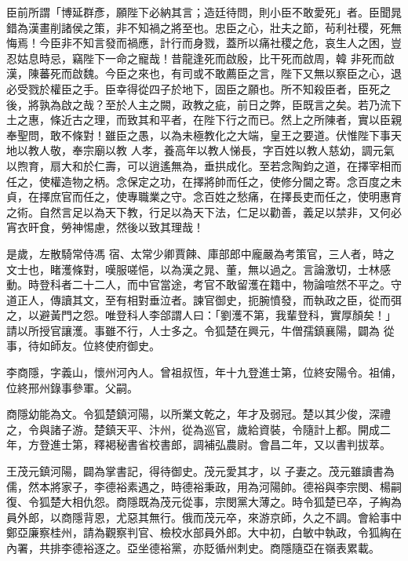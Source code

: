 \begin{pinyinscope}
 臣前所謂「博延群彥，願陛下必納其言；造廷待問，則小臣不敢愛死」者。臣聞晁錯為漢畫削諸侯之策，非不知禍之將至也。忠臣之心，壯夫之節，茍利社稷，死無悔焉！今臣非不知言發而禍應，計行而身戮，蓋所以痛社稷之危，哀生人之困，豈忍姑息時忌，竊陛下一命之寵哉！昔龍逢死而啟殷，比干死而啟周，韓
 非死而啟漢，陳蕃死而啟魏。今臣之來也，有司或不敢薦臣之言，陛下又無以察臣之心，退必受戮於權臣之手。臣幸得從四子於地下，固臣之願也。所不知殺臣者，臣死之後，將孰為啟之哉？至於人主之闕，政教之疵，前日之弊，臣既言之矣。若乃流下土之惠，條近古之理，而致其和平者，在陛下行之而已。然上之所陳者，實以臣親奉聖問，敢不條對！雖臣之愚，以為未極教化之大端，皇王之要道。伏惟陛下事天地以教人敬，奉宗廟以教
 人孝，養高年以教人悌長，字百姓以教人慈幼，調元氣以煦育，扇大和於仁壽，可以逍遙無為，垂拱成化。至若念陶鈞之道，在擇宰相而任之，使權造物之柄。念保定之功，在擇將帥而任之，使修分閫之寄。念百度之未貞，在擇庶官而任之，使專職業之守。念百姓之愁痛，在擇長吏而任之，使明惠育之術。自然言足以為天下教，行足以為天下法，仁足以勸善，義足以禁非，又何必宵衣旰食，勞神惕慮，然後以致其理哉！



 是歲，左散騎常侍馮
 宿、太常少卿賈餗、庫部郎中龐嚴為考策官，三人者，時之文士也，睹濩條對，嘆服嗟悒，以為漢之晁、董，無以過之。言論激切，士林感動。時登科者二十二人，而中官當途，考官不敢留濩在籍中，物論喧然不平之。守道正人，傳讀其文，至有相對垂泣者。諫官御史，扼腕憤發，而執政之臣，從而弭之，以避黃門之怨。唯登科人李郃謂人曰：「劉濩不第，我輩登科，實厚顏矣！」請以所授官讓濩。事雖不行，人士多之。令狐楚在興元，牛僧孺鎮襄陽，闢為
 從事，待如師友。位終使府御史。



 李商隱，字義山，懷州河內人。曾祖叔恆，年十九登進士第，位終安陽令。祖俌，位終邢州錄事參軍。父嗣。



 商隱幼能為文。令狐楚鎮河陽，以所業文乾之，年才及弱冠。楚以其少俊，深禮之，令與諸子游。楚鎮天平、汴州，從為巡官，歲給資裝，令隨計上都。開成二年，方登進士第，釋褐秘書省校書郎，調補弘農尉。會昌二年，又以書判拔萃。



 王茂元鎮河陽，闢為掌書記，得待御史。茂元愛其才，以
 子妻之。茂元雖讀書為儒，然本將家子，李德裕素遇之，時德裕秉政，用為河陽帥。德裕與李宗閔、楊嗣復、令狐楚大相仇怨。商隱既為茂元從事，宗閔黨大薄之。時令狐楚已卒，子綯為員外郎，以商隱背恩，尤惡其無行。俄而茂元卒，來游京師，久之不調。會給事中鄭亞廉察桂州，請為觀察判官、檢校水部員外郎。大中初，白敏中執政，令狐綯在內署，共排李德裕逐之。亞坐德裕黨，亦貶循州刺史。商隱隨亞在嶺表累載。




\end{pinyinscope}
